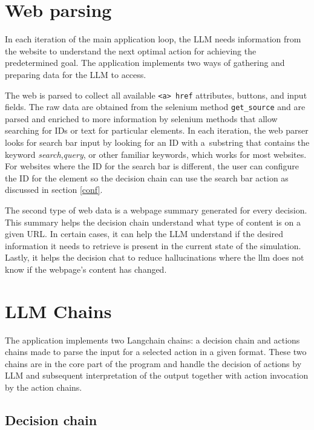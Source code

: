 \section{Web parsing}

In each iteration of the main application loop, the LLM needs information from the website to understand the next optimal action for achieving the predetermined goal. The application implements two ways of gathering and preparing data for the LLM to access. 

The web is parsed to collect all available \texttt{<a> href} attributes, buttons, and input fields. The raw data are obtained from the selenium method \verb|get_source| and are parsed and enriched to more information by selenium methods that allow searching for IDs or text for particular elements. In each iteration, the web parser looks for search bar input by looking for an ID with a~substring that contains the keyword \textit{search},\textit{query}, or other familiar keywords, which works for most websites. For websites where the ID for the search bar is different, the user can configure the ID for the element so the decision chain can use the search bar action as discussed in section \ref{conf}. 

The second type of web data is a webpage summary generated for every decision. This summary helps the decision chain understand what type of content is on a given URL. In certain cases, it can help the LLM understand if the desired information it needs to retrieve is present in the current state of the simulation. Lastly, it helps the decision chat to reduce hallucinations where the llm does not know if the webpage's content has changed. 

\section{LLM Chains}

The application implements two Langchain chains: a decision chain and actions chains made to parse the input for a selected action in a given format. These two chains are in the core part of the program and handle the decision of actions by LLM and subsequent interpretation of the output together with action invocation by the action chains.

\subsection{Decision chain}

